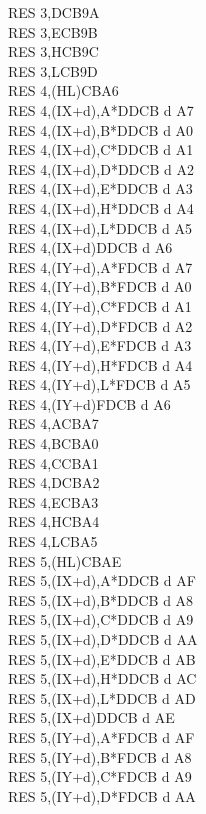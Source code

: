 \documentclass[oneside,a4paper]{book}
\begin{document}
\begin{multicols}{3}
{\begin{tabbing}
RES 3,D\>CB9A\\
RES 3,E\>CB9B\\
RES 3,H\>CB9C\\
RES 3,L\>CB9D\\
RES 4,(HL)\>CBA6\\
RES 4,(IX+d),A*\>DDCB d A7\\
RES 4,(IX+d),B*\>DDCB d A0\\
RES 4,(IX+d),C*\>DDCB d A1\\
RES 4,(IX+d),D*\>DDCB d A2\\
RES 4,(IX+d),E*\>DDCB d A3\\
RES 4,(IX+d),H*\>DDCB d A4\\
RES 4,(IX+d),L*\>DDCB d A5\\
RES 4,(IX+d)\>DDCB d A6\\
RES 4,(IY+d),A*\>FDCB d A7\\
RES 4,(IY+d),B*\>FDCB d A0\\
RES 4,(IY+d),C*\>FDCB d A1\\
RES 4,(IY+d),D*\>FDCB d A2\\
RES 4,(IY+d),E*\>FDCB d A3\\
RES 4,(IY+d),H*\>FDCB d A4\\
RES 4,(IY+d),L*\>FDCB d A5\\
RES 4,(IY+d)\>FDCB d A6\\
RES 4,A\>CBA7\\
RES 4,B\>CBA0\\
RES 4,C\>CBA1\\
RES 4,D\>CBA2\\
RES 4,E\>CBA3\\
RES 4,H\>CBA4\\
RES 4,L\>CBA5\\
RES 5,(HL)\>CBAE\\
RES 5,(IX+d),A*\>DDCB d AF\\
RES 5,(IX+d),B*\>DDCB d A8\\
RES 5,(IX+d),C*\>DDCB d A9\\
RES 5,(IX+d),D*\>DDCB d AA\\
RES 5,(IX+d),E*\>DDCB d AB\\
RES 5,(IX+d),H*\>DDCB d AC\\
RES 5,(IX+d),L*\>DDCB d AD\\
RES 5,(IX+d)\>DDCB d AE\\
RES 5,(IY+d),A*\>FDCB d AF\\
RES 5,(IY+d),B*\>FDCB d A8\\
RES 5,(IY+d),C*\>FDCB d A9\\
RES 5,(IY+d),D*\>FDCB d AA\\

\end{tabbing}}
\end{multicols}
\end{document}
